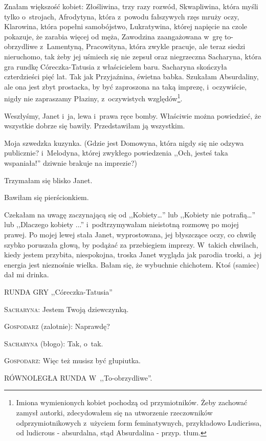 \documentclass[oneside,polish,12pt,sfheadings]{mwbk}
\begin{document}
Znałam większość kobiet: Złośliwina, trzy razy rozwód, Skwapliwina,
która myśli tylko o~strojach, Afrodytyna, która z~powodu fałszywych
rzęs mruży oczy, Klarowina, która popełni samobójstwo, Lukratywina,
której napięcie na czole pokazuje, że zarabia więcej od męża, Zawodzina
zaangażowana w~grę to-obrzydliwe z~Lamentyną, Pracowityna, która zwykle
pracuje, ale teraz siedzi nieruchomo, tak żeby jej uśmiech się nie
zepsuł oraz niegrzeczna Sacharyna, która gra rundkę Córeczka-Tatusia
z właścicielem baru.  Sacharyna
skończyła czterdzieści pięć lat. Tak jak Przyjaźnina, świetna babka.
Szukałam Absurdaliny, ale ona jest zbyt prostacka, by być zaproszona
na taką imprezę, i~oczywiście, nigdy nie zapraszamy Płaziny, z~oczywistych
względów\footnote{Imiona wymienionych kobiet pochodzą od przymiotników.
Żeby zachować zamysł autorki, zdecydowałem się na utworzenie rzeczowników
odprzymiotnikowych z~użyciem form feminatywnych, przykładowo Ludicrissa,
od ludicrous - absurdalna, stąd Absurdalina - przyp. tłum.}.

Weszłyśmy, Janet i~ja, lewa i~prawa ręce bomby. Właściwie można powiedzieć,
że wszystkie dobrze się bawiły. Przedstawiłam ją wszystkim.

Moja szwedzka kuzynka. (Gdzie jest Domowyna, która nigdy się nie odzywa
publicznie? i~Melodyna, której zwykłego powiedzenia ,,Och, jesteś
taka wspaniała!'' dziwnie brakuje na imprezie?)

Trzymałam się blisko Janet.

Bawiłam się pierścionkiem.

Czekałam na uwagę zaczynającą się od ,,Kobiety\ldots'' lub ,,Kobiety
nie potrafią\ldots'' lub ,,Dlaczego kobiety ...'' i~podtrzymywałam nieistotną
rozmowę po mojej prawej. Po mojej lewej stała Janet, wyprostowana,
jej błyszczące oczy, co chwilę szybko poruszała głową, by podążać
za przebiegiem imprezy. W~takich chwilach, kiedy jestem przybita,
niespokojna, troska Janet wygląda jak parodia troski, a~jej energia
jest nieznośnie wielka. Bałam się, że wybuchnie chichotem. Ktoś (samiec)
dał mi drinka.

RUNDA GRY ,,Córeczka-Tatusia''

\textsc{Sacharyna}: Jestem Twoją dziewczynką.

\textsc{Gospodarz} (zalotnie): Naprawdę?

\textsc{Sacharyna} (błogo): Tak, o~tak.

\textsc{Gospodarz}: Więc też musisz być głupiutka.

RÓWNOLEGŁA RUNDA W~,,To-obrzydliwe''.
\end{document}
